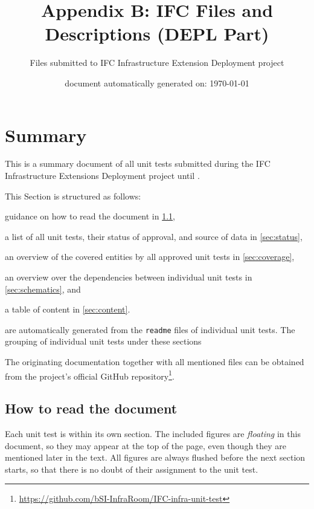 \documentclass{scrartcl}
\title{Appendix B: IFC Files and Descriptions (DEPL Part)}
\author{Files submitted to IFC Infrastructure Extension Deployment project}
\date{document automatically generated on: \today}
\begin{document}
\maketitle
{}

\section{Summary}
\label{sec:summary}

This is a summary document of all unit tests submitted during the IFC Infrastructure Extensions Deployment project until .

This Section is structured as follows:
\begin{compactitem}
  \item guidance on how to read the document in \cref{sec:how_to},
  \item a list of all unit tests, their status of approval, and source of data in \cref{sec:status},
  \item an overview of the covered entities by all approved unit tests in \cref{sec:coverage},
  \item an overview over the dependencies between individual unit tests in \cref{sec:schematics}, and
  \item a table of content in \cref{sec:content}.
\end{compactitem}
 are automatically generated from the \texttt{readme} files of individual unit tests.
The grouping of individual unit tests under these sections 

The originating documentation together with all mentioned files can be obtained
 from the project's official GitHub repository\footnote{\url{https://github.com/bSI-InfraRoom/IFC-infra-unit-test}}.

\subsection{How to read the document}
\label{sec:how_to}

Each unit test is within its own section.
The included figures are \emph{floating} in this document, so they may appear at the top of the page,
 even though they are mentioned later in the text.
All figures are always flushed before the next section starts, so that there is no doubt of their assignment to the unit test.
\end{document}
